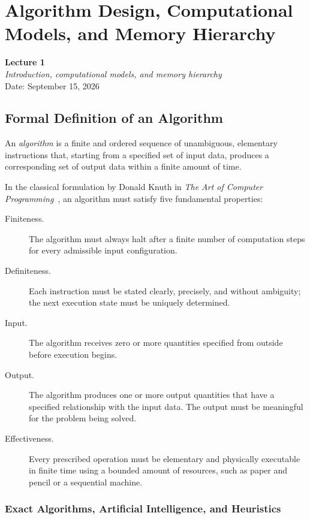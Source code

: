 \chapter{Algorithm Design, Computational Models, and Memory Hierarchy}
\label{cha:lecture-one}

\begin{center}
  \textbf{Lecture 1}\\
  \emph{Introduction, computational models, and memory hierarchy}\\[0.5em]
  Date: September 15, 2026
\end{center}

\section{Formal Definition of an Algorithm}
\label{sec:formal-algorithm}

An \emph{algorithm} is a finite and ordered sequence of unambiguous,
elementary instructions that, starting from a specified set of input data,
produces a corresponding set of output data within a finite amount of time.

In the classical formulation by Donald Knuth in \emph{The Art of Computer
Programming}~\cite{knuth1997}, an algorithm must satisfy five fundamental
properties:

\begin{description}
  \item[Finiteness.] The algorithm must always halt after a finite number of
    computation steps for every admissible input configuration.
  \item[Definiteness.] Each instruction must be stated clearly, precisely, and
    without ambiguity; the next execution state must be uniquely determined.
  \item[Input.] The algorithm receives zero or more quantities specified from
    outside before execution begins.
  \item[Output.] The algorithm produces one or more output quantities that
    have a specified relationship with the input data. The output must be
    meaningful for the problem being solved.
  \item[Effectiveness.] Every prescribed operation must be elementary and
    physically executable in finite time using a bounded amount of resources,
    such as paper and pencil or a sequential machine.
\end{description}

\subsection{Exact Algorithms, Artificial Intelligence, and Heuristics}
\label{sec:exact-vs-heuristic}

